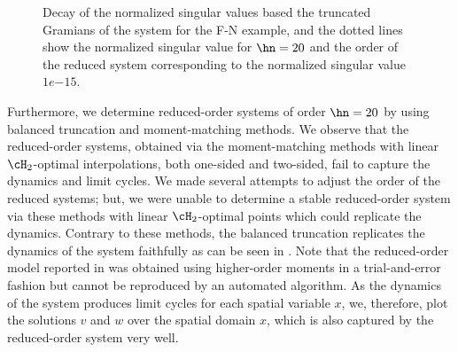 \begin{figure}[tb!]
        \centering
  \centering
  	\setlength\fheight{3cm}
	\setlength\fwidth{5cm}
\caption{Decay of the normalized singular values based the truncated Gramians of the system for the F-N example, and the dotted lines show the normalized singular value for $\hn =  20$ and the order of the reduced system corresponding to the normalized singular value  $1e{-15}$.}
	\label{fig:Fitz_sigma}

\end{figure}

Furthermore, we determine reduced-order systems of order $\hn =  20 $ by using balanced truncation and moment-matching methods. We observe that the reduced-order systems, obtained via the moment-matching methods with linear $\cH_2$-optimal interpolations, both one-sided and two-sided, fail to capture the dynamics and limit cycles. We made several attempts to adjust the order of the reduced systems; but, we were unable to determine a stable reduced-order system via these methods with linear $\cH_2$-optimal points which could replicate the dynamics. Contrary to these methods,  the balanced truncation replicates the dynamics of the system faithfully as  can be seen in .   Note that the reduced-order model reported in \cite{morBenB12a} was obtained using higher-order moments in a trial-and-error fashion but cannot be reproduced by an automated algorithm. As the dynamics of the system produces limit cycles for each spatial variable $x$, we, therefore, plot the solutions $v$ and $w$ over the
spatial domain $x$, which is also captured by the reduced-order system very well.
